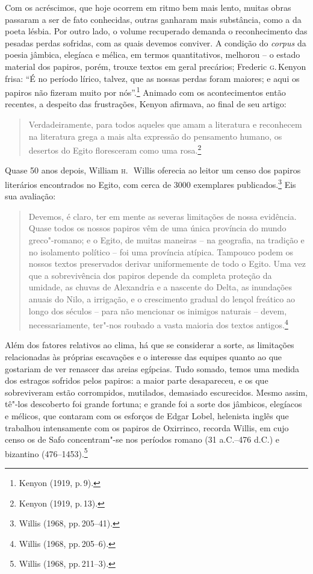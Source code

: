 Com os acréscimos, que hoje ocorrem em ritmo bem mais lento,
muitas obras passaram a ser de fato conhecidas, outras ganharam mais
substância, como a da poeta lésbia. Por outro lado, o volume recuperado demanda
o reconhecimento das pesadas perdas sofridas, com as quais devemos conviver. A
condição do \textit{corpus} da poesia jâmbica, elegíaca e mélica, em termos
quantitativos, melhorou -- o estado material dos papiros, porém, trouxe textos
em geral precários; Frederic \textsc{g}.\,Kenyon frisa:
“É no período lírico, talvez, que as nossas perdas foram maiores; e aqui os
papiros não fizeram muito por nós”.\footnote{ Kenyon (1919, p.\,9).} Animado com os acontecimentos então
recentes, a despeito das frustrações, Kenyon afirmava, ao final de seu
artigo: 

\begin{quote}
Verdadeiramente, para todos aqueles que amam a literatura e reconhecem
na literatura grega a mais alta expressão do pensamento humano, os desertos do
Egito floresceram como uma rosa.\footnote{ Kenyon (1919, p.\,13).}
\end{quote}


Quase 50 anos depois, William \textsc{h}.~\,Willis oferecia ao
leitor um censo dos papiros literários encontrados no Egito, com cerca de 3000
exemplares publicados.\footnote{ Willis (1968, pp.\,205--41).} Eis sua avaliação: 

\begin{quote}
Devemos, é claro, ter em mente as severas limitações de nossa evidência. Quase
todos os nossos papiros vêm de uma única província do mundo greco"-romano; e o
Egito, de muitas maneiras -- na geografia, na tradição e no isolamento político
-- foi uma província atípica. Tampouco podem os nossos textos preservados
derivar uniformemente de todo o Egito. Uma vez que a sobrevivência dos papiros
depende da completa proteção da umidade, as chuvas de Alexandria e a nascente
do Delta, as inundações anuais do Nilo, a irrigação, e o crescimento gradual do
lençol freático ao longo dos séculos -- para não mencionar os inimigos naturais
-- devem, necessariamente, ter"-nos roubado a vasta maioria dos textos antigos.\footnote{ Willis (1968, pp.\,205--6).}
\end{quote}

Além dos fatores relativos ao clima, há que se considerar a sorte, as limitações
relacionadas às próprias escavações e o interesse das equipes quanto ao que
gostariam de ver renascer das areias egípcias. Tudo somado, temos uma medida
dos estragos sofridos pelos papiros: a maior parte desapareceu, e os que
sobreviveram estão corrompidos, mutilados, demasiado escurecidos. Mesmo assim,
tê"-los descoberto foi grande fortuna; e grande foi a sorte dos jâmbicos,
elegíacos e mélicos, que contaram com os esforços de Edgar Lobel, helenista
inglês que trabalhou intensamente com os papiros de Oxirrinco, recorda Willis,
em cujo censo os de Safo concentram"-se nos períodos
romano (31 a.C.--476 d.C.) e bizantino (476--1453).\footnote{ Willis (1968, pp.\,211--3).}

